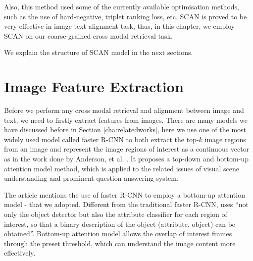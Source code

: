 Also, this method used some of the currently available optimisation methods, such as the use of hard-negative, triplet ranking loss, etc. SCAN is proved to be very effective in image-text alignment task, thus, in this chapter, we employ SCAN on our coarse-grained cross modal retrieval task.


We explain the structure of SCAN model in the next sections.

\section{Image Feature Extraction}
Before we perform any cross modal retrieval and alignment between image and text, we need to firstly extract features from images. There are many models we have discussed before in Section \ref{cha:relatedworks}, here we use one of the most widely used model called faster R-CNN to both extract the top-$k$ image regions from an image and represent the image regions of interest as a continuous vector as in the work done by Anderson, et al. \cite{bottomup}. It proposes a top-down and bottom-up attention model method, which is applied to the related issues of visual scene understanding and prominent question answering system.  

The article mentions the use of faster R-CNN to employ a bottom-up attention model - that we adopted. Different from the traditional faster R-CNN, \cite{bottomup} uses ``not only the object detector but also the attribute classifier for each region of interest, so that a binary description of the object (attribute, object) can be obtained''. Bottom-up attention model allows the overlap of interest frames through the preset threshold, which can understand the image content more effectively.



